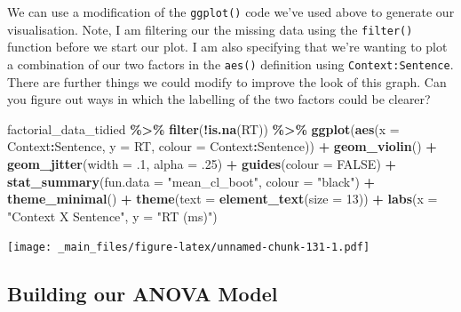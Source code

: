 \documentclass[
]{book}
\newenvironment{Shaded}{\begin{snugshade}}{\end{snugshade}}
\newcommand{\AttributeTok}[1]{\textcolor[rgb]{0.13,0.29,0.53}{#1}}
\newcommand{\ConstantTok}[1]{\textcolor[rgb]{0.56,0.35,0.01}{#1}}
\newcommand{\DecValTok}[1]{\textcolor[rgb]{0.00,0.00,0.81}{#1}}
\newcommand{\FunctionTok}[1]{\textcolor[rgb]{0.13,0.29,0.53}{\textbf{#1}}}
\newcommand{\NormalTok}[1]{#1}
\newcommand{\SpecialCharTok}[1]{\textcolor[rgb]{0.81,0.36,0.00}{\textbf{#1}}}
\newcommand{\StringTok}[1]{\textcolor[rgb]{0.31,0.60,0.02}{#1}}
\begin{document}
We can use a modification of the \texttt{ggplot()} code we've used above to generate our visualisation. Note, I am filtering our the missing data using the \texttt{filter()} function before we start our plot. I am also specifying that we're wanting to plot a combination of our two factors in the \texttt{aes()} definition using \texttt{Context:Sentence}. There are further things we could modify to improve the look of this graph. Can you figure out ways in which the labelling of the two factors could be clearer?

\begin{Shaded}
\begin{Highlighting}[]
\NormalTok{factorial\_data\_tidied }\SpecialCharTok{\%\textgreater{}\%}
  \FunctionTok{filter}\NormalTok{(}\SpecialCharTok{!}\FunctionTok{is.na}\NormalTok{(RT)) }\SpecialCharTok{\%\textgreater{}\%}
  \FunctionTok{ggplot}\NormalTok{(}\FunctionTok{aes}\NormalTok{(}\AttributeTok{x =}\NormalTok{ Context}\SpecialCharTok{:}\NormalTok{Sentence, }\AttributeTok{y =}\NormalTok{ RT, }\AttributeTok{colour =}\NormalTok{ Context}\SpecialCharTok{:}\NormalTok{Sentence)) }\SpecialCharTok{+}
  \FunctionTok{geom\_violin}\NormalTok{() }\SpecialCharTok{+}
  \FunctionTok{geom\_jitter}\NormalTok{(}\AttributeTok{width =}\NormalTok{ .}\DecValTok{1}\NormalTok{, }\AttributeTok{alpha =}\NormalTok{ .}\DecValTok{25}\NormalTok{) }\SpecialCharTok{+}
  \FunctionTok{guides}\NormalTok{(}\AttributeTok{colour =} \ConstantTok{FALSE}\NormalTok{) }\SpecialCharTok{+}
  \FunctionTok{stat\_summary}\NormalTok{(}\AttributeTok{fun.data =} \StringTok{"mean\_cl\_boot"}\NormalTok{, }\AttributeTok{colour =} \StringTok{"black"}\NormalTok{) }\SpecialCharTok{+}
  \FunctionTok{theme\_minimal}\NormalTok{() }\SpecialCharTok{+}
  \FunctionTok{theme}\NormalTok{(}\AttributeTok{text =} \FunctionTok{element\_text}\NormalTok{(}\AttributeTok{size =} \DecValTok{13}\NormalTok{)) }\SpecialCharTok{+}
  \FunctionTok{labs}\NormalTok{(}\AttributeTok{x =} \StringTok{"Context X Sentence"}\NormalTok{, }\AttributeTok{y =} \StringTok{"RT (ms)"}\NormalTok{)}
\end{Highlighting}
\end{Shaded}

\texttt{[image: \_main\_files/figure-latex/unnamed-chunk-131-1.pdf]}

\hypertarget{building-our-anova-model-2}{%
\subsection{Building our ANOVA Model}\label{building-our-anova-model-2}}
\end{document}
